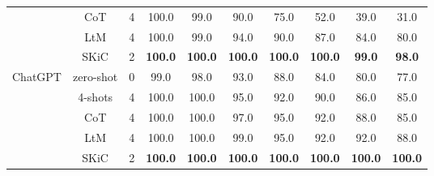 \documentclass{article} \usepackage{arxiv}
\begin{document}
\begin{table}[th]
\begin{tabular}{c|c|c|cc|ccccc}
                           & CoT  &4        & 100.0                   & 99.0                    & 90.0                    & 75.0                    & 52.0                    & 39.0                     & 31.0                     \\
                           & LtM &4 & 100.0                   & 99.0                    & 94.0                    & 90.0                    & 87.0                    & 84.0                     & 80.0                     \\
                           & SKiC  &2 & \textbf{100.0}          & \textbf{100.0}          & \textbf{100.0}          & \textbf{100.0}          & \textbf{100.0}          & \textbf{99.0}           & \textbf{98.0}            \\  \midrule
\multirow{5}{*}{ChatGPT}   & zero-shot &0           & 99.0                    & 98.0                    & 93.0                    & 88.0                    & 84.0                    & 80.0                     & 77.0                     \\
                           & 4-shots  &4      & 100.0                   & 100.0                   & 95.0                    & 92.0                    & 90.0                    & 86.0                     & 85.0                     \\
                           & CoT    &4       & 100.0                   & 100.0                   & 97.0                    & 95.0                    & 92.0                    & 88.0                     & 85.0                     \\
                           & LtM &4 & 100.0                   & 100.0                   & 99.0                    & 95.0                    & 92.0                    & 92.0                     & 88.0                     \\
                           & SKiC  &2 & \textbf{100.0}          & \textbf{100.0}          & \textbf{100.0}          & \textbf{100.0}          & \textbf{100.0}          & \textbf{100.0}           & \textbf{100.0}       \\ \bottomrule    
\end{tabular}
\end{table}
\end{document}
